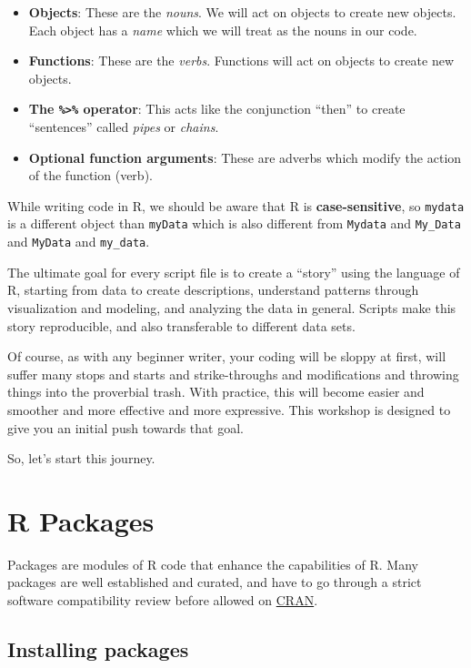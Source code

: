 \documentclass[12pt,letterpaperpaper,openany]{book}
\providecommand{\tightlist}{%
  \setlength{\itemsep}{0pt}\setlength{\parskip}{0pt}}
\begin{document}
\begin{itemize}
\tightlist
\item
  \textbf{Objects}: These are the \emph{nouns}. We will act on objects to create new objects. Each object has a \emph{name} which we will treat as the nouns in our code.
\item
  \textbf{Functions}: These are the \emph{verbs}. Functions will act on objects to create new objects.
\item
  \textbf{The \texttt{\%\textgreater{}\%} operator}: This acts like the conjunction ``then'' to create ``sentences'' called \emph{pipes} or \emph{chains}.
\item
  \textbf{Optional function arguments}: These are adverbs which modify the action of the function (verb).
\end{itemize}

While writing code in R, we should be aware that R is \textbf{case-sensitive}, so \texttt{mydata} is a different object
than \texttt{myData} which is also different from \texttt{Mydata} and \texttt{My\_Data} and \texttt{MyData} and \texttt{my\_data}.

The ultimate goal for every script file is to create a ``story'' using the language of R,
starting from data to create descriptions, understand patterns through visualization and modeling,
and analyzing the data in general. Scripts make this story reproducible, and also transferable to different data sets.

Of course, as with any beginner writer, your coding will be sloppy at first, will suffer many
stops and starts and strike-throughs and modifications and throwing things into the proverbial trash. With practice, this will become easier and smoother and more effective and more expressive. This workshop is designed to give you an initial push towards that goal.

So, let's start this journey.

\hypertarget{r-packages}{%
\section*{R Packages}\label{r-packages}}

Packages are modules of R code that enhance the capabilities of R. Many packages are well established and curated, and have to go through a strict software compatibility review before allowed on \href{https://cran.rstudio.com}{CRAN}.

\hypertarget{installing-packages}{%
\subsection*{Installing packages}\label{installing-packages}}
\end{document}
